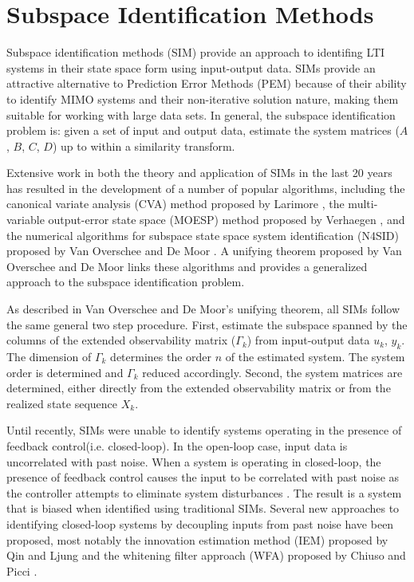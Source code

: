 \chapter{Subspace Identification Methods}
Subspace identification methods (SIM) provide an approach to identifing LTI systems in their state space form using input-output data. SIMs provide an attractive alternative to Prediction Error Methods (PEM) because of their ability to identify MIMO systems and their non-iterative solution nature, making them suitable for working with large data sets. In general, the subspace identification problem is: given a set of input and output data, estimate the system matrices ($A$, $B$, $C$, $D$) up to within a similarity transform. 

Extensive work in both the theory and application of SIMs in the last 20 years has resulted in the development of a number of popular algorithms, including the canonical variate analysis (CVA) method proposed by Larimore \cite{larimore1990canonical}, the multi-variable output-error state space (MOESP) method proposed by Verhaegen \cite{verhaegen1992subspace}, and the numerical algorithms for subspace state space system identification (N4SID) proposed by Van Overschee and De Moor \cite{van1994n4sid}. A unifying theorem proposed by Van Overschee and De Moor \cite{van1995unifying} links these algorithms and provides a generalized approach to the subspace identification problem.  

As described in Van Overschee and De Moor's unifying theorem, all SIMs follow the same general two step procedure. First, estimate the subspace spanned by the columns of the extended observability matrix ($\Gamma_k$) from input-output data $u_k$, $y_k$. The dimension of $\Gamma_k$ determines the order $n$ of the estimated system. The system order is determined and $\Gamma_k$ reduced accordingly. Second, the system matrices are determined, either directly from the extended observability matrix or from the realized state sequence $X_k$.

Until recently, SIMs were unable to identify systems operating in the presence of feedback control(i.e. closed-loop). In the open-loop case, input data is uncorrelated with past noise. When a system is operating in closed-loop, the presence of feedback control causes the input to be correlated with past noise as the controller attempts to eliminate system disturbances \cite{qin2006overview}. The result is a system that is biased when identified using traditional SIMs. Several new approaches to identifying closed-loop systems by decoupling inputs from past noise have been proposed, most notably the innovation estimation method (IEM) proposed by Qin and Ljung \cite{qin2003closed} and the whitening filter approach (WFA) proposed by Chiuso and Picci \cite{chiuso2005consistency}.


